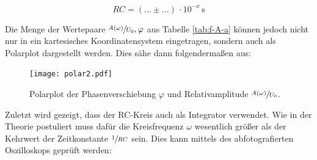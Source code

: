 \begin{equation}
    RC = \left(... \pm ...\right)\,\cdot 10^{-x}\,\unit{\second}
\end{equation}


\noindent Die Menge der Wertepaare ${\sfrac{A(\omega)}{U_0},\varphi}$ aus Tabelle \ref{tab:f-A-a} können jedoch nicht nur in ein kartesisches Koordinatensystem eingetragen, sondern
auch als Polarplot dargestellt werden. Dies sähe dann folgendermaßen aus:

\begin{figure}[H]
    \centering
    \texttt{[image: polar2.pdf]}
    \caption{Polarplot der Phasenverschiebung $\varphi$ und Relativamplitude $\sfrac{A(\omega)}{U_0}$.}
    \label{fig:polar}
\end{figure}

\noindent Zuletzt wird gezeigt, dass der RC-Kreis auch als Integrator verwendet. Wie in der Theorie postuliert muss dafür die Kreisfrequenz $\omega$
wesentlich größer als der Kehrwert der Zeitkonstante $\sfrac{1}{RC}$ sein. Dies kann mittels des abfotografierten Oszilloskops geprüft werden:

